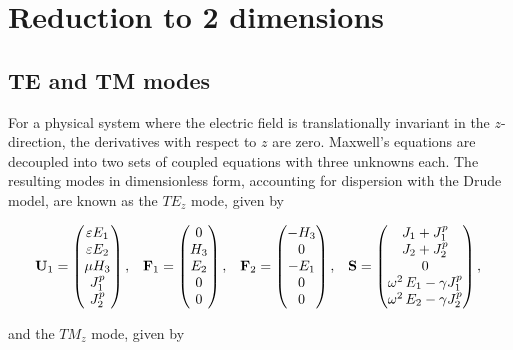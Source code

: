 
\section{Reduction to 2 dimensions}
\subsection{TE and TM modes}
For a physical system where the electric field is translationally invariant in
the $z$-direction, the derivatives with respect to $z$ are zero. Maxwell's
equations are decoupled into two sets of coupled equations with three unknowns
each. The resulting modes in dimensionless form, accounting for dispersion with
the Drude model, are known as the $TE_z$ mode, given by

\begin{equation*}
  \begin{array}{ccccc}
    \mathbf{U}_1 = \begin{pmatrix} \varepsilon E_1 \\ \varepsilon E_2 \\ \mu H_3 \\ J^p_1 \\  J^p_2 \end{pmatrix} ,
 &
   \mathbf{F}_1 = \begin{pmatrix} 0 \\ H_3 \\ E_2 \\ 0 \\  0 \end{pmatrix} ,
 &
   \mathbf{F}_2 = \begin{pmatrix} - H_3 \\ 0 \\ -E_1 \\ 0 \\ 0 \end{pmatrix} ,
 &
   \mathbf{S} = \begin{pmatrix} J_1 + J^p_1 \\ J_2+ J^p_2 \\ 0 \\ \omega^2 \, E_1 - \gamma J^p_1 \\  \omega^2 \, E_2 - \gamma J^p_2 \end{pmatrix} ,
  \end{array}
  \:
\end{equation*}

and the $TM_z$ mode, given by

